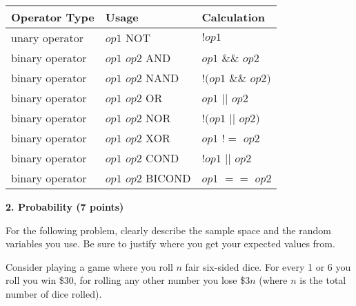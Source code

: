 \documentclass[12pt]{elsart}
\begin{document}
\begin{center}
  \begin{tabular}{ | p{3.5cm} | p{4cm} | p{4cm} | }
    \hline
    {\bf Operator Type} & {\bf Usage} & {\bf Calculation}  \\ \hline \hline
    unary operator & $op1$ NOT &  $!op1$ \\ \hline
    binary operator & $op1$ $op2$ AND &  $op1$ \&\& $op2$ \\ 
    binary operator & $op1$ $op2$ NAND & $!(op1$ \&\& $op2)$ \\ 
    binary operator & $op1$ $op2$ OR & $op1$ $\vert \vert$ $op2$ \\ 
    binary operator & $op1$ $op2$ NOR & $!(op1$ $\vert \vert$ $op2)$ \\ 
    binary operator & $op1$ $op2$ XOR & $op1$ $!=$ $op2$ \\ 
    binary operator & $op1$ $op2$ COND & $!op1$ $\vert \vert$ $op2$ \\ 
    binary operator & $op1$ $op2$ BICOND & $op1$ $==$ $op2$ \\ \hline
  \end{tabular}
\end{center}

\newpage

{\bf 2.  Probability (7 points)}

For the following problem, clearly describe the sample space and the random variables you use.  Be sure to justify where you get your expected values from.

Consider playing a game where you roll $n$ fair six-sided dice.  For every 1 or 6 you roll you win \$30, for rolling any other number you lose \$$3 n$ (where $n$ is the total number of dice rolled).
\end{document}
